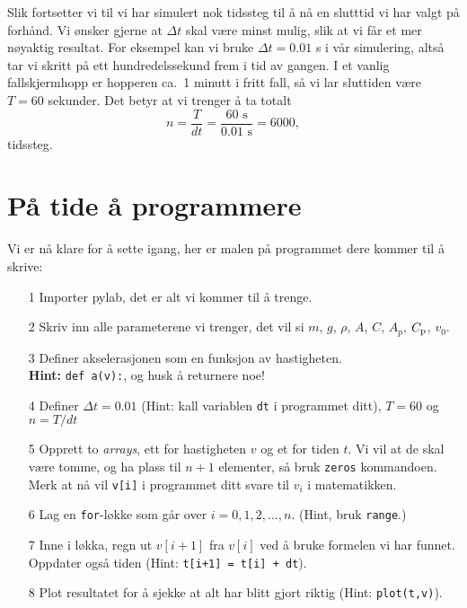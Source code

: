 \documentclass[a4paper, 11pt, notitlepage, english]{article}
\begin{document}
Slik fortsetter vi til vi har simulert nok tidssteg til å nå en slutttid vi har valgt på forhånd. Vi ønsker gjerne at $\Delta t$ skal være minst mulig, slik at vi får et mer nøyaktig resultat. For eksempel kan vi bruke $\Delta t = 0.01$ s i vår simulering, altså tar vi skritt på ett hundredelssekund frem i tid av gangen. I et vanlig fallskjermhopp er hopperen ca.\ 1 minutt i fritt fall, så vi lar sluttiden være $T=60$ sekunder. Det betyr at vi trenger å ta totalt
$$n = \frac{T}{dt} = \frac{60 \mbox{ s}}{0.01 \mbox{ s}} = 6000,$$
tidssteg.

\clearpage 

\section*{På tide å programmere}

Vi er nå klare for å sette igang, her er malen på programmet dere kommer til å skrive:
\begin{itemize}
    \item[1] Importer pylab, det er alt vi kommer til å trenge.
    \item[2] Skriv inn alle parameterene vi trenger, det vil si $m$, $g$, $\rho$, $A$, $C$, $A_{p}$, $C_{\rm p}$, $v_0$.
    \item[3] Definer akselerasjonen som en funksjon av hastigheten. \\
    \textbf{Hint:} \verb+def a(v):+, og husk å returnere noe!
    \item[4] Definer $\Delta t = 0.01$ (Hint: kall variablen \verb+dt+ i programmet ditt), $T=60$ og $n = T/dt$
    \item[5] Opprett to \emph{arrays}, ett for hastigheten $v$ og et for tiden $t$. Vi vil at de skal være tomme, og ha plass til $n+1$ elementer, så bruk \verb+zeros+ kommandoen. Merk at nå vil \verb+v[i]+ i programmet ditt svare til $v_i$ i matematikken.
    \item[6] Lag en \verb+for+-løkke som går over $i=0,1,2,\ldots,n$. (Hint, bruk \verb+range+.)
    \item[7] Inne i løkka, regn ut $v[i+1]$ fra $v[i]$ ved å bruke formelen vi har funnet. Oppdater også tiden (Hint: \verb!t[i+1] = t[i] + dt!).
    \item[8] Plot resultatet for å sjekke at alt har blitt gjort riktig (Hint: \verb+plot(t,v)+).
\end{itemize}
\end{document}
